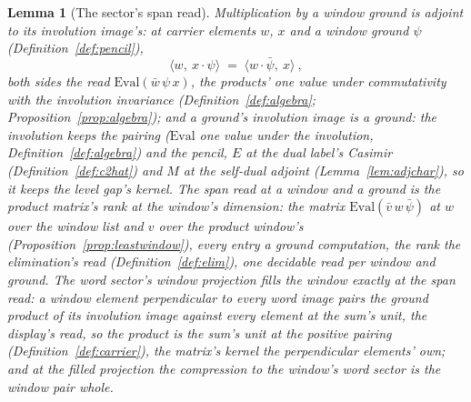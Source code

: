 \documentclass[11pt]{article}
\newtheorem{lemma}{Lemma}
\theoremstyle{definition}
\begin{document}
\begin{lemma}[The sector's span read]\label{lem:sectorspan}
Multiplication by a window ground is adjoint to its involution image's: at
carrier elements $w$, $x$ and a window ground $\psi$
(Definition~\ref{def:pencil}),
\[
\langle w,\ x\cdot\psi\rangle\;=\;\langle w\cdot\bar\psi,\ x\rangle\ ,
\]
both sides the read $\mathrm{Eval}(\bar w\,\psi\,x)$, the products'
one value under commutativity with the involution invariance
(Definition~\ref{def:algebra}; Proposition~\ref{prop:algebra}); and
a ground's involution image is a ground: the involution keeps the pairing
($\mathrm{Eval}$ one value under the involution,
Definition~\ref{def:algebra}) and the pencil, $E$ at the dual
label's Casimir (Definition~\ref{def:c2hat}) and $M$ at the
self-dual adjoint (Lemma~\ref{lem:adjchar}), so it keeps the level
gap's kernel. The \emph{span read} at a window and a ground is the
product matrix's rank at the window's dimension: the matrix
$\mathrm{Eval}(\bar v\,w\,\bar\psi)$ at $w$ over the window list
and $v$ over the product window's
(Proposition~\ref{prop:leastwindow}), every entry a ground
computation, the rank the elimination's read
(Definition~\ref{def:elim}), one decidable read per window and
ground. The word sector's window projection fills the window
exactly at the span read: a window element perpendicular to every
word image pairs the ground product of its involution image against every
element at the sum's unit, the display's read, so the product is
the sum's unit at the positive pairing
(Definition~\ref{def:carrier}), the matrix's kernel the
perpendicular elements' own; and at the filled projection the
compression to the window's word sector is the window pair whole.
\end{lemma}
\end{document}
